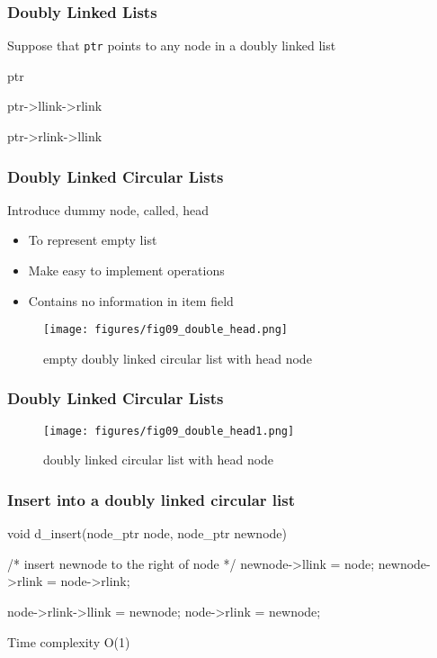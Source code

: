 \documentclass[newPxFont,sthlmFooter,nooffset]{beamer}
\begin{document}
\begin{frame}[t, fragile]
  \frametitle{Doubly Linked Lists}
Suppose that \texttt{ptr} points to any node in a doubly linked list

\begin{ncodedef}
ptr 

ptr->llink->rlink

ptr->rlink->llink
\end{ncodedef}


\end{frame}
\begin{frame}[t]
  \frametitle{Doubly Linked Circular Lists}
Introduce dummy node, called, head
\begin{itemize}
\item To represent empty list
\item Make easy to implement operations 
\item Contains no information in item field
\end{itemize}
\bigskip
\begin{figure}
  \begin{center}
    \texttt{[image: figures/fig09\_double\_head.png]}
    \caption{empty doubly linked circular list with head node}
  \end{center}
\end{figure}
\end{frame}

\begin{frame}[t]
  \frametitle{Doubly Linked Circular Lists}
  \begin{figure}
  \begin{center}
    \texttt{[image: figures/fig09\_double\_head1.png]}
    \caption{doubly linked circular list with head node}
  \end{center}
\end{figure}
\end{frame}

\begin{frame}[t, fragile]
  \frametitle{Insert into a doubly linked circular list}
  \begin{ncodedef}
void d_insert(node_ptr node, node_ptr newnode) {
    /* insert newnode to the right of node */ 
    newnode->llink = node;
    newnode->rlink = node->rlink; 

    node->rlink->llink = newnode; 
    node->rlink = newnode;
}    
  \end{ncodedef}

Time complexity O(1)
\end{frame}
\end{document}
